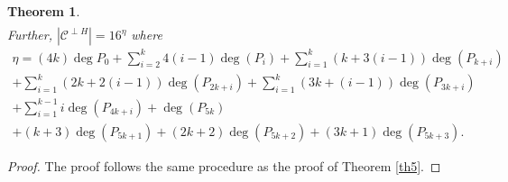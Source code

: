 \documentclass{amsart}
\newtheorem{theorem}{Theorem}[section]
\theoremstyle{definition}
\theoremstyle{remark}
\numberwithin{equation}{section}
\begin{document}
\begin{theorem}
\begin{gather*}
\end{gather*}
Further, $|\mathcal{C}^{\perp H}|=16^{\eta}$ where
\begin{gather*}
    \eta = (4k)\deg {P_0} +\sum_{i=2}^{k} 4(i-1)\deg (P_i) +\sum_{i=1}^{k} (k+3(i-1)) \deg (P_{k+i}) \\ + \sum_{i=1}^{k} (2k+2(i-1)) \deg (P_{2k+i}) + \sum_{i=1}^{k} (3k+(i-1)) \deg (P_{3k+i}) \\+\sum_{i=1}^{k-1} i \deg (P_{4k+i}) + \deg (P_{5k}) \\+ (k+3)\deg (P_{5k+1}) + (2k+2) \deg (P_{5k+2}) + (3k+1)\deg (P_{5k+3}).
\end{gather*}

\end{theorem}
\begin{proof}
    The proof follows the same procedure as the proof of Theorem \ref{th5}.
\end{proof}
\end{document}
